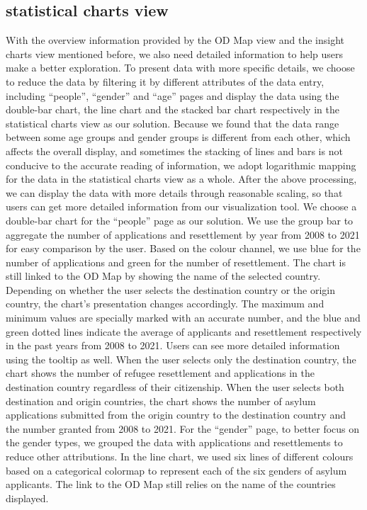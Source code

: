 \documentclass[journal]{vgtc}                %
\begin{document}
 \subsection{statistical charts view}
 With the overview information provided by the OD Map view and the insight charts view mentioned before, we also need detailed information to help users make a better exploration. To present data with more specific details, we choose to reduce the data by filtering it by different attributes of the data entry, including “people”, “gender” and “age” pages and display the data using the double-bar chart, the line chart and the stacked bar chart respectively in the statistical charts view as our solution.
 Because we found that the data range between some age groups and gender groups is different from each other, which affects the overall display, and sometimes the stacking of lines and bars is not conducive to the accurate reading of information, we adopt logarithmic mapping for the data in the statistical charts view as a whole. After the above processing, we can display the data with more details through reasonable scaling, so that users can get more detailed information from our visualization tool.
 We choose a double-bar chart for the “people” page as our solution. We use the group bar to aggregate the number of applications and resettlement by year from 2008 to 2021 for easy comparison by the user. Based on the colour channel, we use blue for the number of applications and green for the number of resettlement. The chart is still linked to the OD Map by showing the name of the selected country. Depending on whether the user selects the destination country or the origin country, the chart's presentation changes accordingly. The maximum and minimum values are specially marked with an accurate number, and the blue and green dotted lines indicate the average of applicants and resettlement respectively in the past years from 2008 to 2021. Users can see more detailed information using the tooltip as well.
 When the user selects only the destination country, the chart shows the number of refugee resettlement and applications in the destination country regardless of their citizenship. When the user selects both destination and origin countries, the chart shows the number of asylum applications submitted from the origin country to the destination country and the number granted from 2008 to 2021.
 For the “gender” page, to better focus on the gender types, we grouped the data with applications and resettlements to reduce other attributions. In the line chart, we used six lines of different colours based on a categorical colormap to represent each of the six genders of asylum applicants. The link to the OD Map still relies on the name of the countries displayed.
\end{document}
